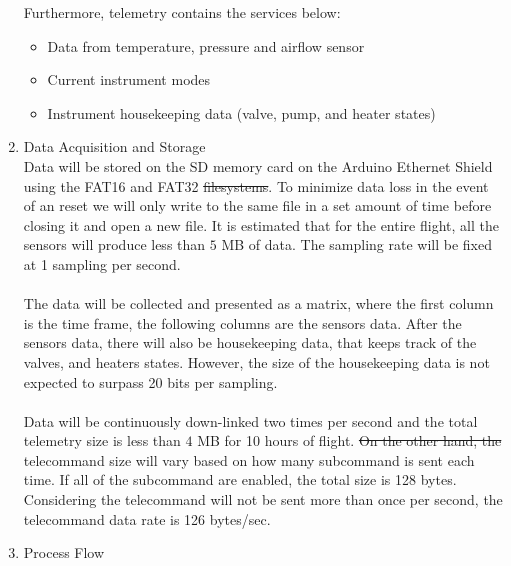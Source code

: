 \documentclass[a4paper,12pt,oneside]{article} %
\providecommand{\DIFaddtex}[1]{{\protect\color{blue}\uwave{#1}}} %
\providecommand{\DIFdeltex}[1]{{\protect\color{red}\sout{#1}}}                      %
\providecommand{\DIFaddbegin}{} %
\providecommand{\DIFaddend}{} %
\providecommand{\DIFdelbegin}{} %
\providecommand{\DIFdelend}{} %
\providecommand{\DIFadd}[1]{\texorpdfstring{\DIFaddtex{#1}}{#1}} %
\providecommand{\DIFdel}[1]{\texorpdfstring{\DIFdeltex{#1}}{}} %
\newcommand{\DIFscaledelfig}{0.5}
\newlength{\DIFdelgraphicswidth} %
\newlength{\DIFdelgraphicsheight} %
\newcommand{\DIFaddincludegraphics}[2][]{{\color{blue}\fbox{\DIFOincludegraphics[#1]{#2}}}} %
\newcommand{\DIFdelincludegraphics}[2][]{%
\sbox{\DIFdelgraphicsbox}{\DIFOincludegraphics[#1]{#2}}%
\settoboxwidth{\DIFdelgraphicswidth}{\DIFdelgraphicsbox} %
\settoboxtotalheight{\DIFdelgraphicsheight}{\DIFdelgraphicsbox} %
\scalebox{\DIFscaledelfig}{%
\parbox[b]{\DIFdelgraphicswidth}{\usebox{\DIFdelgraphicsbox}\\[-\baselineskip] \rule{\DIFdelgraphicswidth}{0em}}\llap{\resizebox{\DIFdelgraphicswidth}{\DIFdelgraphicsheight}{%
\setlength{\unitlength}{\DIFdelgraphicswidth}%
\begin{picture}(1,1)%
\thicklines\linethickness{2pt} %
{\color[rgb]{1,0,0}\put(0,0){\framebox(1,1){}}}%
{\color[rgb]{1,0,0}\put(0,0){\line( 1,1){1}}}%
{\color[rgb]{1,0,0}\put(0,1){\line(1,-1){1}}}%
\end{picture}%
}\hspace*{3pt}}} %
} %
\DeclareRobustCommand{\DIFaddbegin}{\DIFOaddbegin \let\includegraphics\DIFaddincludegraphics} %
\DeclareRobustCommand{\DIFaddend}{\DIFOaddend \let\includegraphics\DIFOincludegraphics} %
\DeclareRobustCommand{\DIFdelbegin}{\DIFOdelbegin \let\includegraphics\DIFdelincludegraphics} %
\DeclareRobustCommand{\DIFdelend}{\DIFOaddend \let\includegraphics\DIFOincludegraphics} %
\begin{document}
\begin{enumerate}[label=(\alph*)]
Furthermore, telemetry contains the services below:
\begin{itemize}
    \item Data from temperature, pressure and airflow sensor
    \item Current instrument modes
    \item Instrument housekeeping data (valve, pump, and heater states)
\end{itemize}
\item{Data Acquisition and Storage}\\
Data will be stored on the SD memory card on the Arduino Ethernet Shield using the FAT16 and FAT32 \DIFdelbegin \DIFdel{filesystems}\DIFdelend \DIFaddbegin \DIFadd{file systems}\DIFaddend . To minimize data loss in the event of an reset we will only write to the same file in a set amount of time before closing it and open a new file. It is estimated that for the entire flight, all the sensors will produce less than $5$ MB of data. The sampling rate will be fixed at 1 sampling per second.\\
\\
The data will be collected and presented as a matrix, where the first column is the time frame, the following columns are the sensors data. After the sensors data, there will also be housekeeping data, that keeps track of the valves, and heaters states. However, the size of the housekeeping data is not expected to surpass 20 bits per sampling.\\
\\
Data will be continuously down-linked two times per second and the total telemetry size is less than $4$ MB for 10 hours of flight. \DIFdelbegin \DIFdel{On the other hand, the }\DIFdelend \DIFaddbegin \DIFadd{The }\DIFaddend telecommand size will \DIFaddbegin \DIFadd{on the other hand }\DIFaddend vary based on how many subcommand is sent each time. If all of the subcommand are enabled, the total size is 128 bytes. Considering the telecommand will not be sent more than once per second, the telecommand data rate is 126 bytes/sec.
\item{Process Flow}\\

\end{enumerate}
\end{document}
